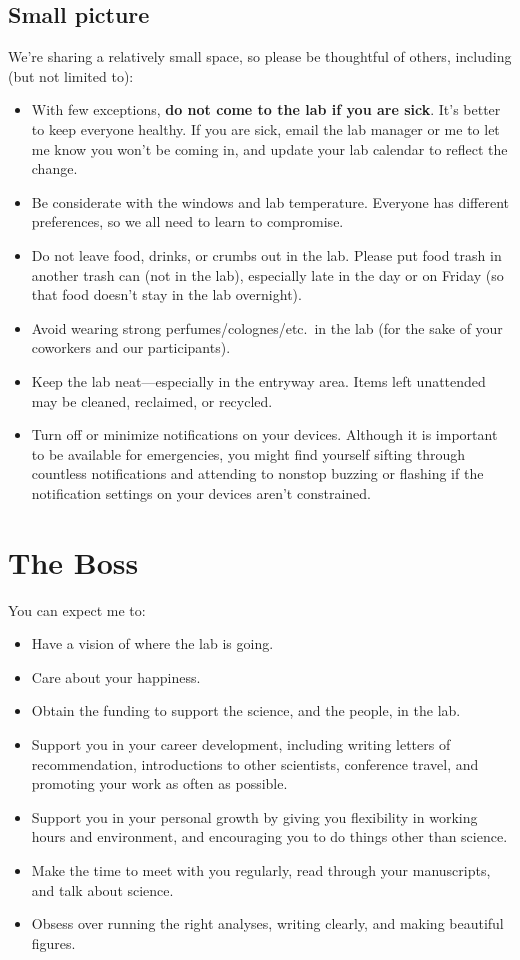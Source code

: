 \documentclass[letterpaper,12pt,oneside]{memoir}
\begin{document}
\subsection{Small picture}

We're sharing a relatively small space, so please be thoughtful of others, including (but not limited to):

\begin{itemize}
\item With few exceptions, \textbf{do not come to the lab if you are sick}. It's better to keep everyone healthy. If you are sick, email the lab manager or me to let me know you won't be coming in, and update your lab calendar to reflect the change.
\item Be considerate with the windows and lab temperature. Everyone has different preferences, so we all need to learn to compromise.
\item Do not leave food, drinks, or crumbs out in the lab. Please put food trash in another trash can (not in the lab), especially late in the day or on Friday (so that food doesn't stay in the lab overnight).
\item Avoid wearing strong perfumes/colognes/etc.\ in the lab (for the sake of your coworkers and our participants).
\item Keep the lab neat---especially in the entryway area. Items left unattended may be cleaned, reclaimed, or recycled.
\item Turn off or minimize notifications on your devices. Although it is important to be available for emergencies, you might find yourself sifting through countless notifications and attending to nonstop buzzing or flashing if the notification settings on your devices aren't constrained.
\end{itemize}


\section{The Boss}

You can expect me to:

\begin{itemize}
\item Have a vision of where the lab is going.
\item Care about your happiness.
\item Obtain the funding to support the science, and the people, in the lab.
\item Support you in your career development, including writing letters of recommendation, introductions to other scientists, conference travel, and promoting your work as often as possible.
\item Support you in your personal growth by giving you flexibility in working hours and environment, and encouraging you to do things other than science.
\item Make the time to meet with you regularly, read through your manuscripts, and talk about science.
\item Obsess over running the right analyses, writing clearly, and making beautiful figures.
\end{itemize}
\end{document}

